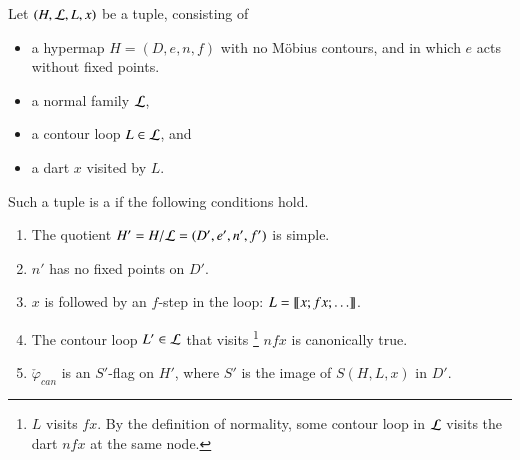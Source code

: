 \begin{definition}\label{def:marked}
Let $(H,{\cal L},L,x)$ be a tuple, consisting of 
\begin{itemize}
\item a hypermap $H=(D,e,n,f)$ with no M\"obius contours, and in which
  $e$ acts without fixed points.  %
\item a normal family ${\cal L}$, 
\item a contour loop $L\in{\cal L}$, and
\item a dart $x$ visited by $L$.
\end{itemize}
Such a tuple is a  if
the following conditions hold.
\begin{enumerate}
\item The quotient $H'=H/{\cal L} = (D',e',n',f')$ is simple.  
\item $n'$ has no fixed points on $D'$.
\item $x$ is followed by an $f$-step in the loop: $L = {\llbracket{x;fx;\ldots}\rrbracket}$.
\item The contour loop $L'\in {\cal L}$ that visits%
\footnote{$L$ visits  $f x$.  By the definition of normality, some contour loop in
${\cal L}$ visits the dart $n f x$ at the same node.} 
$n f x$ is canonically true.
\item 
  $\check\varphi_{can}$ is an $S'$-flag on $H'$, where $S'$ is the image of 
  $S(H,L,x)$ in $D'$.  %
\end{enumerate}
\end{definition}







